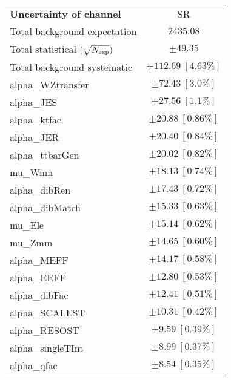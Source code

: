 
\begin{table}
\begin{center}
\setlength{\tabcolsep}{0.0pc}
\begin{tabular*}{\textwidth}{@{\extracolsep{\fill}}lc}
\noalign{\smallskip}\hline\noalign{\smallskip}
{\bf Uncertainty of channel}                                    & SR            \\
\noalign{\smallskip}\hline\noalign{\smallskip}
Total background expectation             &  $2435.08$       \\
\noalign{\smallskip}\hline\noalign{\smallskip}
Total statistical $(\sqrt{N_{\rm exp}})$              & $\pm 49.35$       \\
Total background systematic               & $\pm 112.69\ [4.63\%] $             \\
\noalign{\smallskip}\hline\noalign{\smallskip}
\noalign{\smallskip}\hline\noalign{\smallskip}
alpha\_WZtransfer         & $\pm 72.43\ [3.0\%] $       \\
alpha\_JES         & $\pm 27.56\ [1.1\%] $       \\
alpha\_ktfac         & $\pm 20.88\ [0.86\%] $       \\
alpha\_JER         & $\pm 20.40\ [0.84\%] $       \\
alpha\_ttbarGen         & $\pm 20.02\ [0.82\%] $       \\
mu\_Wmn         & $\pm 18.13\ [0.74\%] $       \\
alpha\_dibRen         & $\pm 17.43\ [0.72\%] $       \\
alpha\_dibMatch         & $\pm 15.33\ [0.63\%] $       \\
mu\_Ele         & $\pm 15.14\ [0.62\%] $       \\
mu\_Zmm         & $\pm 14.65\ [0.60\%] $       \\
alpha\_MEFF         & $\pm 14.17\ [0.58\%] $       \\
alpha\_EEFF         & $\pm 12.80\ [0.53\%] $       \\
alpha\_dibFac         & $\pm 12.41\ [0.51\%] $       \\
alpha\_SCALEST         & $\pm 10.31\ [0.42\%] $       \\
alpha\_RESOST         & $\pm 9.59\ [0.39\%] $       \\
alpha\_singleTInt         & $\pm 8.99\ [0.37\%] $       \\
alpha\_qfac         & $\pm 8.54\ [0.35\%] $       \\

\end{tabular*}
\end{center}
\end{table}
